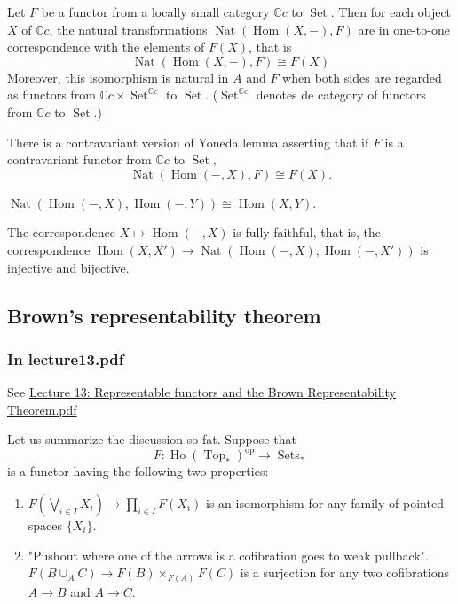 \begin{lemma}
	Let $F$ be a functor from a locally small category $\mathbb{C}c$ to $\operatorname{Set}$. Then for each object $X$ of $\mathbb{C}c$, the natural transformations $\operatorname{Nat}(\operatorname{Hom}(X,-),F)$ are in one-to-one correspondence with the elements of $F(X)$, that is
	\[\operatorname{Nat}(\operatorname{Hom}(X,-), F)\cong F(X)\]
	Moreover, this isomorphism is natural in $A$ and $F$ when both sides are regarded as functors from $\mathbb{C}c\times\operatorname{Set}^{\mathbb{C}c}$ to $\operatorname{Set}$. ($\operatorname{Set}^{\mathbb{C}c}$ denotes de category of functors from $\mathbb{C}c$ to $\operatorname{Set}$.)
	
	There is a contravariant version of Yoneda lemma asserting that if $F$ is a contravariant functor from $\mathbb{C}c$ to $\operatorname{Set}$,
	\[\operatorname{Nat}(\operatorname{Hom}(-,X), F)\cong F(X).\]
\end{lemma}
\begin{coro}
	$\operatorname{Nat} (\operatorname{Hom}(-,X),\operatorname{Hom}(-,Y))\cong\operatorname{Hom}(X,Y)$.
\end{coro}
\begin{remark}
	The correspondence $X\mapsto\operatorname{Hom}(-,X)$ is fully faithful, that is, the correspondence $\operatorname{Hom}(X,X')\to\operatorname{Nat}(\operatorname{Hom}(-,X),\operatorname{Hom}(-,X'))$ is injective and bijective.
\end{remark}

\subsection{Brown's representability theorem}

\subsubsection{In lecture13.pdf}

See \href{https://www.math.ru.nl/~gutierrez/files/Lecture13.pdf}{Lecture 13: Representable functors and the Brown Representability Theorem.pdf}

Let us summarize the discussion so fat. Suppose that
\[F:\operatorname{Ho}(\operatorname{Top}_*)^{\operatorname{op}}\to \operatorname{Sets}_{*}\]
is a functor having the following two properties:
\begin{enumerate}[label=(\roman*)]
	\item $F\left( \bigvee_{i\in I}X_{i} \right) \to \prod_{i\in I}F(X_{i})$ is an isomorphism for any family of pointed spaces $\{X_{i}\} $.
\item {\color{blue}"Pushout where one of the arrows is a cofibration goes to weak pullback".} $F(B\cup_{A}C)\to F(B)\times_{F(A)} F(C)$ is a surjection for any two cofibrations $A\to B$ and $A\to C$.
\end{enumerate}

